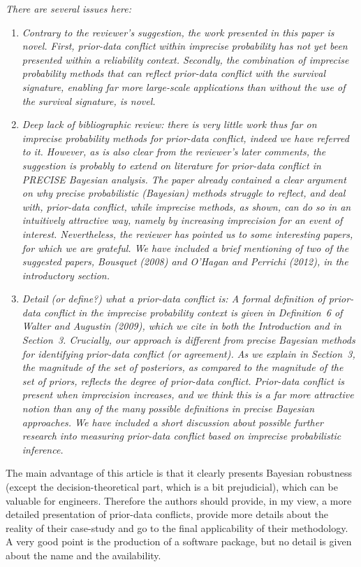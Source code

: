 \documentclass[Journal,SectionNumbers,SingleSpace,InsideFigs]{ascelike}
\begin{document}
\emph{There are several issues here:}
\begin{enumerate}
\item \emph{Contrary to the reviewer's suggestion, the work presented in this paper is novel.
First, prior-data conflict within imprecise probability has not yet been presented within a reliability context.
Secondly, the combination of imprecise probability methods that can reflect prior-data conflict with the survival signature,
enabling far more large-scale applications than without the use of the survival signature, is novel.}
\item \emph{Deep lack of bibliographic review:
there is very little work thus far on imprecise probability methods for prior-data conflict, indeed we have referred to it.
However, as is also clear from the reviewer's later comments,
the suggestion is probably to extend on literature for prior-data conflict in PRECISE Bayesian analysis.
The paper already contained a clear argument on why precise probabilistic (Bayesian) methods struggle to reflect,
and deal with, prior-data conflict, while imprecise methods, as shown, can do so in an intuitively attractive way,
namely by increasing imprecision for an event of interest.
Nevertheless, the reviewer has pointed us to some interesting papers, for which we are grateful.
We have included a brief mentioning of two of the suggested papers,
Bousquet (2008) and O'Hagan and Perrichi (2012), in the introductory section.}
\item \emph{Detail (or define?) what a prior-data conflict is:
A formal definition of prior-data conflict in the imprecise probability context is given in Definition~6
of Walter and Augustin (2009), which we cite in both the Introduction and in Section~3.
Crucially, our approach is different from precise Bayesian methods for identifying prior-data conflict (or agreement).
As we explain in Section~3,
the magnitude of the set of posteriors, as compared to the magnitude of the set of priors,
reflects the degree of prior-data conflict.
Prior-data conflict is present when imprecision increases,
and we think this is a far more attractive notion than any of the many possible definitions in precise Bayesian approaches.
We have included a short discussion about possible further research into measuring prior-data conflict
based on imprecise probabilistic inference.}
\end{enumerate}

The main advantage of this article is that it clearly presents Bayesian robustness (except the decision-theoretical part,
which is a bit prejudicial), which can be valuable for engineers.
Therefore the authors should provide, in my view, a more detailed presentation of prior-data conflicts,
provide more details about the reality of their case-study and go to the final applicability of their methodology.
A very good point is the production of a software package, but no detail is given about the name and the availability.
\end{document}
